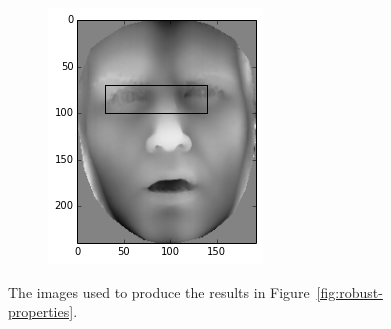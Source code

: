 \begin{figure}[t]
\begin{subfigure}{0.45\columnwidth}
        \includegraphics[width=\columnwidth]{images/face2}
        \subcaption{}
        \label{subfig:robust-face2}
    \end{subfigure}
    \caption{The images used to produce the results in Figure~\ref{fig:robust-properties}.}
    \label{fig:robust-faces}
\end{figure}
